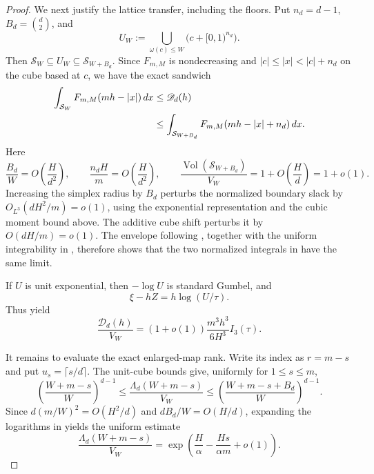 \documentclass[11pt,letterpaper]{article}
\theoremstyle{definition}
\begin{document}
\begin{proof}
We next justify the lattice transfer, including the floors. Put
$n_d=d-1$, $B_d=\binom d2$, and
\[
  U_W:=\bigcup_{\omega(c)\leq W}\bigl(c+[0,1)^{n_d}\bigr).
\]
Then $\mathcal S_W\subseteq U_W\subseteq\mathcal S_{W+B_d}$. Since
$F_{m,M}$ is nondecreasing and
$|c|\leq|x|<|c|+n_d$ on the cube based at $c$, we have the exact
sandwich
\begin{align}
  \int_{\mathcal S_W}F_{m,M}(mh-|x|)\,dx
  &\leq \mathscr D_d(h) \notag\\
  &\leq
  \int_{\mathcal S_{W+B_d}}
    F_{m,M}(mh-|x|+n_d)\,dx.
  \label{eq:boundary-dimension-sandwich}
\end{align}
Here
\[
  \frac{B_d}{W}=O\left(\frac{H}{d^2}\right),
  \qquad
  \frac{n_dH}{m}=O\left(\frac{H}{d^2}\right),
  \qquad
  \frac{\operatorname{Vol}(\mathcal S_{W+B_d})}{V_W}
  =1+O\left(\frac Hd\right)=1+o(1).
\]
Increasing the simplex radius by $B_d$ perturbs the normalized boundary
slack by $O_{L^3}(dH^2/m)=o(1)$, using the exponential representation and
the cubic moment bound above. The additive cube shift perturbs it by
$O(dH/m)=o(1)$. The envelope following
, together with the uniform integrability
in , therefore shows that the two normalized
integrals in  have the same limit.

If $U$ is unit exponential, then $-\log U$ is standard Gumbel, and
\[
  \xi-hZ=h\log(U/\tau).
\]
Thus  yield
\begin{equation}
  \frac{\mathscr D_d(h)}{V_W}
  =
  (1+o(1))
  \frac{m^3h^3}{6H^3}I_3(\tau).
  \label{eq:boundary-dimension-asymptotic}
\end{equation}

It remains to evaluate the exact enlarged-map rank. Write its index as
$r=m-s$ and put $u_s=\lceil s/d\rceil$. The unit-cube bounds give,
uniformly for $1\leq s\leq m$,
\begin{equation}
  \left(\frac{W+m-s}{W}\right)^{d-1}
  \leq\frac{\Lambda_d(W+m-s)}{V_W}
  \leq
  \left(\frac{W+m-s+B_d}{W}\right)^{d-1}.
  \label{eq:boundary-rank-lattice-sandwich}
\end{equation}
Since $d(m/W)^2=O(H^2/d)$ and $dB_d/W=O(H/d)$, expanding the
logarithms in  yields the uniform
estimate
\begin{equation}
  \frac{\Lambda_d(W+m-s)}{V_W}
  =\exp\left(\frac H\alpha-\frac{Hs}{\alpha m}+o(1)\right).
  \label{eq:boundary-rank-lattice-asymptotic}
\end{equation}


\end{proof}
\end{document}
